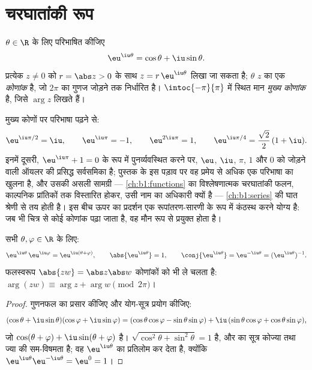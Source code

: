 \section{चरघातांकी रूप}

\begin{definition}[काल्पनिक प्रांतिक का सम्मिश्र चरघातांकी]\label{def:b1:complex:expi}
$\theta \in \R$ के लिए परिभाषित कीजिए
\[
\eu^{\iu\theta} = \cos\theta + \iu \sin\theta .
\]
प्रत्येक $z \neq 0$ को $r = \abs z > 0$ के साथ $z = r\,\eu^{\iu\theta}$ लिखा
जा सकता है; $\theta$ $z$ का एक \emph{कोणांक} है, जो $2\pi$ का
गुणज जोड़ने तक निर्धारित है। $\intoc{-\pi}{\pi}$ में स्थित मान \emph{मुख्य
कोणांक} है, जिसे $\arg z$ लिखते हैं।
\end{definition}

\begin{example}\label{ex:b1:complex:eulerid}
मुख्य कोणों पर परिभाषा पढ़ने से:
\[
\eu^{\iu\pi/2} = \iu, \qquad
\eu^{\iu\pi} = -1, \qquad
\eu^{2\iu\pi} = 1, \qquad
\eu^{\iu\pi/4} = \frac{\sqrt2}2\,(1 + \iu) .
\]
इनमें दूसरी, $\eu^{\iu\pi} + 1 = 0$ के रूप में पुनर्व्यवस्थित करने पर,
$\eu$, $\iu$, $\pi$, $1$ और $0$ को जोड़ने वाली ऑयलर की प्रसिद्ध सर्वसमिका
है; पुस्तक के इस पड़ाव पर वह प्रमेय से अधिक एक परिभाषा का खुलना है, और उसकी
असली सामग्री --- \cref{ch:b1:functions} का विश्लेषणात्मक चरघातांकी फलन,
काल्पनिक प्रांतिकों तक विस्तारित होकर, उसी नाम का अधिकारी क्यों है ---
\cref{ch:b1:series} की घात श्रेणी से तय होती है। इस बीच ऊपर का प्रदर्शन एक
रूपांतरण-सारणी के रूप में कंठस्थ करने योग्य है: जब भी चित्र से कोई कोणांक
पढ़ा जाता है, वह मौन रूप से प्रयुक्त होता है।
\end{example}

\begin{theorem}\label{thm:b1:complex:funceq}
सभी $\theta, \varphi \in \R$ के लिए:
\[
\eu^{\iu\theta}\, \eu^{\iu\varphi} = \eu^{\iu(\theta + \varphi)},
\qquad
\abs{\eu^{\iu\theta}} = 1,
\qquad
\conj{\eu^{\iu\theta}} = \eu^{-\iu\theta} = (\eu^{\iu\theta})^{-1}.
\]
फलस्वरूप $\abs{zw} = \abs z \abs w$ कोणांकों को भी ले चलता है: $\arg(zw)
\equiv \arg z + \arg w \pmod{2\pi}$।
\end{theorem}

\begin{proof}
गुणनफल का प्रसार कीजिए और योग-सूत्र प्रयोग कीजिए:
\[
(\cos\theta + \iu\sin\theta)(\cos\varphi + \iu\sin\varphi)
= (\cos\theta\cos\varphi - \sin\theta\sin\varphi)
+ \iu\,(\sin\theta\cos\varphi + \cos\theta\sin\varphi),
\]
जो $\cos(\theta+\varphi) + \iu\sin(\theta+\varphi)$ है। 
$\sqrt{\cos^2\theta + \sin^2\theta} = 1$ है, और  का सूत्र कोज्या तथा
ज्या की सम-विषमता है; वह $\eu^{\iu\theta}$ का प्रतिलोम कर देता है, क्योंकि
$\eu^{\iu\theta}\eu^{-\iu\theta} = \eu^0 = 1$।
\end{proof}

